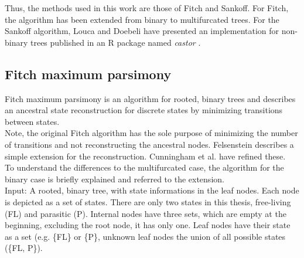     Thus, the methods used in this work are those of Fitch and Sankoff. For Fitch, the algorithm has 
      been extended from binary to multifurcated trees. For the Sankoff algorithm, Louca and Doebeli 
      have presented an implementation for non-binary trees published in an R package named 
      \textit{castor} \cite{Louca2017}.

    \subsection{Fitch maximum parsimony}
      Fitch maximum parsimony is an algorithm for rooted, binary trees and describes an ancestral state 
        reconstruction for discrete states \cite{Fitch1971} by minimizing transitions between states. \\
      Note, the original Fitch algorithm has the sole purpose of minimizing the number of transitions 
        and not reconstructing the ancestral nodes. Felsenstein \cite{Felsenstein2003} describes a 
        simple extension for the reconstruction. Cunningham et al. \cite{Cunningham1998} have refined 
        these.   \\
      To understand the differences to the multifurcated case, the algorithm for the binary case is 
        briefly explained and referred to the extension. \\

      Input: A rooted, binary tree, with state informations in the leaf nodes. Each node is depicted as 
        a set of states. There are only two states in this thesis, free-living (FL) and parasitic (P). 
        Internal nodes have three sets, which are empty at the beginning, excluding the root node, it 
        has only one. Leaf nodes have their state as a set (e.g. \{FL\} or \{P\}, unknown leaf nodes the 
        union of all possible states (\{FL, P\}). \\

